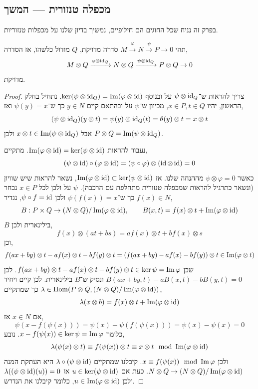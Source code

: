 \subsection{מכפלה טנזורית --- המשך}
בפרק זה נניח שכל החוגים הם חילופיים, נמשיך בדיון שלנו על מכפלות טנזוריות.
\begin{theorem}
	תהי $M \xrightarrow{\varphi} N \xrightarrow{\psi} P \to 0$ סדרה מדויקת, $Q$ מודול כלשהו,
	אז הסדרה,
	\[
		M \otimes Q \xrightarrow{\varphi \otimes \operatorname{id}_Q} N \otimes Q \xrightarrow{\psi \otimes \operatorname{id}_Q} P \otimes Q \to 0
	\]
	מדויקת.
\end{theorem}
\begin{proof}
	צריך להראות ש־$\psi \otimes \operatorname{id}_Q$ על ובנוסף $\ker(\psi \otimes \operatorname{id}_Q) = \operatorname{Im}(\varphi \otimes \operatorname{id})$.
	נתחיל בחלק הראשון, יהיו $x \in P, t \in Q$, מכיוון ש־$\psi$ על ובהתאם קיים $y \in N$ כך ש־$\psi(y) = x$ ואז,
	\[
		(\psi \otimes \operatorname{id}_Q)(y \otimes t)
		= \psi(y) \otimes \operatorname{id}_Q(t)
		= \theta(y) \otimes t
		= x \otimes t
	\]
	אבל $x \otimes t \in \operatorname{Im}(\psi \otimes \operatorname{id}_Q)$ ולכן $P \otimes Q = \operatorname{Im}(\psi \otimes \operatorname{id}_Q)$.

	נעבור להראות $\operatorname{Im}(\varphi \otimes \operatorname{id}) = \ker(\psi \otimes \operatorname{id})$.
	מתקיים,
	\[
		(\psi \otimes \operatorname{id}) \circ (\varphi \otimes \operatorname{id})
		= (\psi \circ \varphi) \otimes (\operatorname{id} \otimes \operatorname{id})
		= 0
	\]
	כאשר $\psi \otimes \varphi = 0$ מההנחה שלנו.
	אז $\operatorname{Im}(\varphi \otimes \operatorname{id}) \subset \ker(\psi \otimes \operatorname{id})$, נשאר להראות שיש שוויון (ונשאר כתרגיל להראות שמכפלה טנזורית מתחלפת עם הרכבה).
	$\psi$ על ולכן לכל $x \in P$ נבחר $f(x) \in N$ כך ש־$\psi(f(x)) = x$ ולכן $\psi \circ f = \operatorname{id}$, נגדיר,
	\[
		B : P \times Q \to (N \otimes Q) / \operatorname{Im}(\varphi \otimes \operatorname{id}),
		\qquad
		B(x, t)
		= f(x) \otimes t + \operatorname{Im}(\varphi \otimes \operatorname{id})
	\]
	$B$ בילינארית ולכן,
	\[
		f(x) \otimes (a t + b s)
		= a f(x) \otimes t + b f(x) \otimes s
	\]
	וכן,
	\[
		f(a x + b y) \otimes t - a f(x) \otimes t - b f(y) \otimes t
		= (f(a x + b y) - a f(x) - b f(y)) \otimes t
		\in \operatorname{Im}(\varphi \otimes t)
	\]
	שכן $f(a x + b y) \otimes t - a f(x) \otimes t - b f(y) \otimes t \in \ker \psi = \operatorname{Im} \varphi$.
	לכן $B(a x + b y, t) - a B(x, t) - b B(y, t) = 0$ ונסיק ש־$B$ בילינארית.
	לכן קיים ויחיד $\lambda \in \operatorname{Hom}(P \otimes Q, (N \otimes Q) / \operatorname{Im}(\varphi \otimes \operatorname{id}))$ כך שמתקיים,
	\[
		\lambda(x \otimes b)
		= f(x) \otimes t + \operatorname{Im}(\varphi \otimes \operatorname{id})
	\]
	אם $x \in N$ אז,
	\[
		\psi(x - f(\psi(x)))
		= \psi(x) - \psi(f(\psi(x)))
		= \psi(x) - \psi(x)
		= 0
	\]
	כלומר $x - f(\psi(x)) \in \ker \psi = \operatorname{Im} \varphi$.
	נובע,
	\[
		\lambda(\psi(x) \otimes t)
		\equiv f(\psi(x)) \otimes t
		\equiv x \otimes t
		\mod {\operatorname{Im}}(\varphi \otimes \operatorname{id})
	\]
	ולכן $x \equiv f(\psi(x)) \mod {\operatorname{Im}} \varphi$.
	קיבלנו שמתקיים $\lambda \circ (\psi \otimes \operatorname{id})$ היא העתקת המנה $N \otimes Q \to (N \otimes Q) / \operatorname{Im}(\varphi \otimes \operatorname{id})$.
	כעת אם $u \in \ker(\psi \otimes \operatorname{id})$ אז $\lambda((\psi \otimes \operatorname{id})(u)) = 0$ ולכן $u \in \operatorname{Im}(\varphi \otimes \operatorname{id})$, כלומר קיבלנו את הנדרש.
\end{proof}
